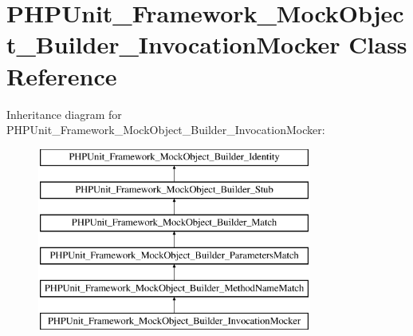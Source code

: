 \hypertarget{class_p_h_p_unit___framework___mock_object___builder___invocation_mocker}{}\section{P\+H\+P\+Unit\+\_\+\+Framework\+\_\+\+Mock\+Object\+\_\+\+Builder\+\_\+\+Invocation\+Mocker Class Reference}
\label{class_p_h_p_unit___framework___mock_object___builder___invocation_mocker}
Inheritance diagram for P\+H\+P\+Unit\+\_\+\+Framework\+\_\+\+Mock\+Object\+\_\+\+Builder\+\_\+\+Invocation\+Mocker\+:\begin{figure}[H]
\begin{center}
\leavevmode
\includegraphics[height=6.000000cm]{class_p_h_p_unit___framework___mock_object___builder___invocation_mocker}
\end{center}
\end{figure}
